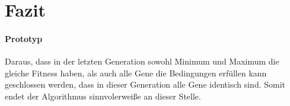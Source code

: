 \section{Fazit}\label{sec:fazit}
\paragraph{Prototyp}
Daraus, dass in der letzten Generation sowohl Minimum und Maximum die gleiche Fitness haben,
als auch alle Gene die Bedingungen erfüllen kann geschlossen werden, dass in dieser Generation alle Gene identisch sind.
Somit endet der Algorithmus sinnvolerweiße an dieser Stelle.